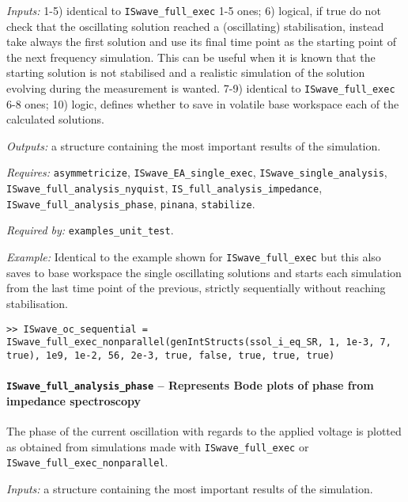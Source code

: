 	\textit{Inputs:} 1-5) identical to \texttt{IS\-wave\_full\_exec} 1-5 ones;
	6) logical, if true do not check that the oscillating solution reached a
	(oscillating) stabilisation, instead take always the first solution
	and use its final time point as the starting point of the next
	frequency simulation. This can be useful when it is known that the
	starting solution is not stabilised and a realistic simulation of the
	solution evolving during the measurement is wanted.
	7-9) identical to \texttt{IS\-wave\_full\_exec} 6-8 ones;
	10) logic, defines whether to save in volatile base
	workspace each of the calculated solutions.

	\textit{Outputs:} a structure containing the most important results of the simulation.

	\textit{Requires:} \texttt{asymmetricize}, \texttt{IS\-wave\_EA\_single\_exec},
	\texttt{IS\-wave\_single\_analysis}, \texttt{IS\-wave\_full\_analysis\_nyquist},
	\texttt{IS\_full\_analysis\_impedance}, \texttt{IS\-wave\_full\_analysis\_phase}, \texttt{pinana},
	\texttt{stabilize}.

	\textit{Required by:} \texttt{examples\_unit\_test}.

	\textit{Example:} Identical to the example shown for \texttt{IS\-wave\_full\_exec} but this also saves to base workspace the single oscillating solutions and starts each simulation from the last time point of the previous, strictly sequentially without reaching stabilisation.
	\begin{lstlisting}[style=Matlab-editor]
>> ISwave_oc_sequential = ISwave_full_exec_nonparallel(genIntStructs(ssol_i_eq_SR, 1, 1e-3, 7, true), 1e9, 1e-2, 56, 2e-3, true, false, true, true, true)
\end{lstlisting}

	\paragraph{\texttt{IS\-wave\_full\_analysis\_phase} -- Represents Bode plots of phase from impedance spectroscopy}
	The phase of the current oscillation with regards to the applied voltage is plotted as obtained from simulations made with \texttt{IS\-wave\_full\_exec} or \texttt{IS\-wave\_full\_exec\_nonparallel}.


	\textit{Inputs:} a structure containing the most important results of the simulation.



